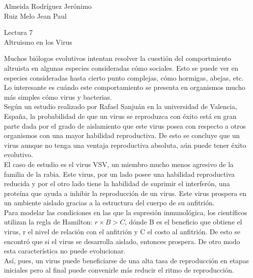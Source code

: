 \documentclass[a4paper, 12pt]{report}
\begin{document}
\begin{flushright}
    Almeida Rodríguez Jerónimo\\
    Ruiz Melo Jean Paul
\end{flushright}

\begin{center}
    {\LARGE Lectura 7}\\
    {\LARGE Altruismo en los Virus}
\end{center}

Muchos biólogos evolutivos intentan resolver la cuestión del comportmiento
altruista en algunas especies consideradas cómo sociales. Esto se puede ver en
especies consideradas hasta cierto punto complejas, cómo hormigas, abejas, etc.
Lo interesante es cuándo este comportamiento se presenta en organismos mucho más
simples cómo virus y bacterias.\\

Según un estudio realizado por Rafael Sanjuán en la universidad de Valencia,
España, la probabilidad de que un virus se reproduzca con éxito está en gran
parte dada por el grado de aislamiento que este virus posea con respecto a otros
organismos con una mayor habilidad reproductiva. De esto se concluye que un
virus aunque no tenga una ventaja reproductiva absoluta, aún puede tener éxito
evolutivo.\\

El caso de estudio es el virus VSV, un miembro mucho menos agresivo de la
familia de la rabia. Este virus, por un lado posee una habilidad reproductiva
reducida y por el otro lado tiene la habilidad de suprimir el interferón, una
proteína que ayuda a inhibir la reproducción de un virus. Este virus prospera en
un ambiente aislado gracias a la estructura del cuerpo de su anfitrión.\\

Para modelar las condiciones en las que la supresión inmunológica, los
científicos utilizan la regla de Hamilton: $r\times B > C$, dónde B es el
beneficio que obtiene el virus, r el nivel de relación con el anfitrión y C el
costo al anfitrión. De esto se encontró que si el virus se desarrolla aislado,
entonces prospera. De otro modo esta característica no puede evolucionar.\\

Así, pues, un virus puede beneficiarse de una alta tasa de reproducción en
etapas iniciales pero al final puede convenirle más reducir el ritmo de
reproducción.
\end{document}
